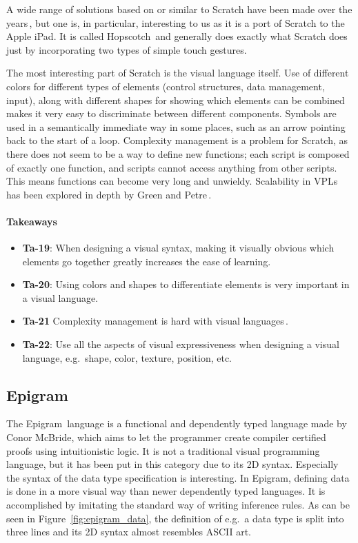A wide range of solutions based on or similar to Scratch have been made over the years\,\cite{hosick2014}, but one is, in particular, interesting to us as it is a port of Scratch to the Apple iPad. It is called Hopscotch\,\cite{hopscotch} and generally does exactly what Scratch does just by incorporating two types of simple touch gestures.

The most interesting part of Scratch is the visual language itself.
Use of different colors for different types of elements (control structures, data management, input), along with different shapes for showing which elements can be combined makes it very easy to discriminate between different components.
Symbols are used in a semantically immediate way in some places, such as an arrow pointing back to the start of a loop. 
Complexity management is a problem for Scratch, as there does not seem to be a way to define new functions; each script is composed of exactly one function, and scripts cannot access anything from other scripts.
This means functions can become very long and unwieldy.
Scalability in VPLs has been explored in depth by Green and Petre\,\cite{green1992visual}.

\paragraph{Takeaways}
\begin{itemize}
	\item \textbf{Ta-19}: When designing a visual syntax, making it visually obvious which elements go together greatly increases the ease of learning.
	\item \textbf{Ta-20}: Using colors and shapes to differentiate elements is very important in a visual language.
	\item \textbf{Ta-21} Complexity management is hard with visual languages\,\cite{green1992visual}.
	\item \textbf{Ta-22}: Use all the aspects of visual expressiveness when designing a visual language, e.g.\ shape, color, texture, position, etc.
\end{itemize}

\subsection{Epigram}
\label{subsub:Epigram}
The Epigram\,\cite{mcbride2005epigram} language is a functional and dependently typed language made by Conor McBride, which aims to let the programmer create compiler certified proofs using intuitionistic logic.
It is not a traditional visual programming language, but it has been put in this category due to its 2D syntax.
Especially the syntax of the data type specification is interesting.
In Epigram, defining data is done in a more visual way than newer dependently typed languages. 
It is accomplished by imitating the standard way of writing inference rules.
As can be seen in Figure~\ref{fig:epigram_data}, the definition of e.g.\ a data type is split into three lines and its 2D syntax almost resembles ASCII art. 

